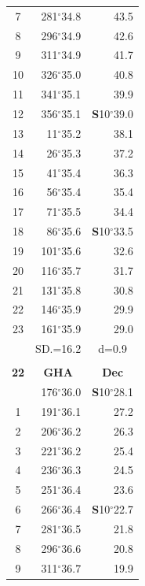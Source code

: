 \documentclass[10pt, a4paper]{report}
\begin{document}
\begin{scriptsize}
\begin{tabular*}{0.2\textwidth}[t]{@{\extracolsep{\fill}}|c|rr|}
7 & 281$^\circ$34.8 & 43.5\\
8 & 296$^\circ$34.9 & 42.6\\
9 & 311$^\circ$34.9 & \raisebox{0.24ex}{\boldmath$\cdot$~\boldmath$\cdot$~~}41.7\\
10 & 326$^\circ$35.0 & 40.8\\
11 & 341$^\circ$35.1 & 39.9\\[2Pt]
12 & 356$^\circ$35.1 & \textbf{S}10$^\circ$39.0\\
13 & 11$^\circ$35.2 & 38.1\\
14 & 26$^\circ$35.3 & 37.2\\
15 & 41$^\circ$35.4 & \raisebox{0.24ex}{\boldmath$\cdot$~\boldmath$\cdot$~~}36.3\\
16 & 56$^\circ$35.4 & 35.4\\
17 & 71$^\circ$35.5 & 34.4\\[2Pt]
18 & 86$^\circ$35.6 & \textbf{S}10$^\circ$33.5\\
19 & 101$^\circ$35.6 & 32.6\\
20 & 116$^\circ$35.7 & 31.7\\
21 & 131$^\circ$35.8 & \raisebox{0.24ex}{\boldmath$\cdot$~\boldmath$\cdot$~~}30.8\\
22 & 146$^\circ$35.9 & 29.9\\
23 & 161$^\circ$35.9 & 29.0\\
\hline
\rule{0pt}{2.4ex} & \multicolumn{1}{c}{SD.=16.2} & \multicolumn{1}{c|}{d=0.9}\\
\hline
\multicolumn{1}{c}{}\\[-0.5ex]\hline
\multicolumn{1}{|c|}{\rule{0pt}{2.6ex}\textbf{22}} & \multicolumn{1}{c}{\textbf{GHA}} & \multicolumn{1}{c|}{\textbf{Dec}}\\
\hline\rule{0pt}{2.6ex}\noindent
0 & 176$^\circ$36.0 & \textbf{S}10$^\circ$28.1\\
1 & 191$^\circ$36.1 & 27.2\\
2 & 206$^\circ$36.2 & 26.3\\
3 & 221$^\circ$36.2 & \raisebox{0.24ex}{\boldmath$\cdot$~\boldmath$\cdot$~~}25.4\\
4 & 236$^\circ$36.3 & 24.5\\
5 & 251$^\circ$36.4 & 23.6\\[2Pt]
6 & 266$^\circ$36.4 & \textbf{S}10$^\circ$22.7\\
7 & 281$^\circ$36.5 & 21.8\\
8 & 296$^\circ$36.6 & 20.8\\
9 & 311$^\circ$36.7 & \raisebox{0.24ex}{\boldmath$\cdot$~\boldmath$\cdot$~~}19.9\\

\end{tabular*}
\end{scriptsize}
\end{document}
